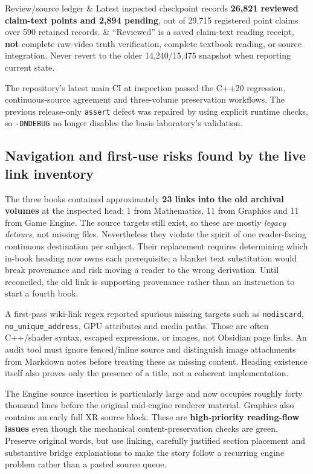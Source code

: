 {\begin{longtable}[]
Review/source ledger & Latest inspected checkpoint records \textbf{26,821 reviewed claim-text points and 2,894 pending}, out of 29,715 registered point claims over 590 retained records. & ``Reviewed'' is a saved claim-text reading receipt, \textbf{not} complete raw-video truth verification, complete textbook reading, or source integration. Never revert to the older 14,240/15,475 snapshot when reporting current state. \\
\end{longtable}
}

The repository's latest main CI at inspection passed the C++20 regression, continuous-source agreement and three-volume preservation workflows. The previous release-only \texttt{assert} defect was repaired by using explicit runtime checks, so \texttt{-DNDEBUG} no longer disables the basis laboratory's validation.

\subsection{Navigation and first-use risks found by the live link inventory}\label{navigation-and-first-use-risks-found-by-the-live-link-inventory}

The three books contained approximately \textbf{23 links into the old archival volumes} at the inspected head: 1 from Mathematics, 11 from Graphics and 11 from Game Engine. The source targets still exist, so these are mostly \emph{legacy detours}, not missing files. Nevertheless they violate the spirit of one reader-facing continuous destination per subject. Their replacement requires determining which in-book heading now owns each prerequisite; a blanket text substitution would break provenance and risk moving a reader to the wrong derivation. Until reconciled, the old link is supporting provenance rather than an instruction to start a fourth book.

A first-pass wiki-link regex reported spurious missing targets such as \texttt{nodiscard}, \texttt{no\_unique\_address}, GPU attributes and media paths. Those are often C++/shader syntax, escaped expressions, or images, not Obsidian page links. An audit tool must ignore fenced/inline source and distinguish image attachments from Markdown notes before treating these as missing content. Heading existence itself also proves only the presence of a title, not a coherent implementation.

The Engine source insertion is particularly large and now occupies roughly forty thousand lines before the original mid-engine renderer material. Graphics also contains an early full XR source block. These are \textbf{high-priority reading-flow issues} even though the mechanical content-preservation checks are green. Preserve original words, but use linking, carefully justified section placement and substantive bridge explanations to make the story follow a recurring engine problem rather than a pasted source queue.

